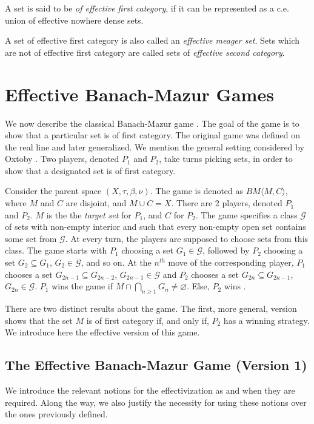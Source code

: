 \documentclass[a4paper,UKenglish,autoref,thm-restate,numberwithinsect]{lipics-v2021}
\begin{document}
\begin{definition}
	A set is said to be \emph{of effective first category}, if it can be represented as a c.e. union of effective nowhere dense sets. 
\end{definition}

A set of effective first category is also called an \textit{effective meager set}. Sets which are not of effective first category are called sets of \textit{effective second category}. 



\section{Effective Banach-Mazur Games}\label{sec:effbmgame}
We now describe the classical Banach-Mazur game \cite{Oxtoby1957}. The goal of the game is to show that a particular set is of first category. The original game was defined on the real line and later generalized. We mention the general setting considered by Oxtoby \cite{Oxtoby1957}. Two players, denoted $P_1$ and $P_2$, take turns picking sets, in order to show that a designated set is of first category. 

Consider the parent space $(X,\tau,\beta,\nu)$. The game is denoted as $BM \langle M,C \rangle$, where $M$ and $C$ are disjoint, and $M\cup C=X$. There are 2 players, denoted $P_1$ and $P_2$. $M$ is the the \textit{target set} for $P_1$, and $C$ for $P_2$. The game specifies a class $\mathcal{G}$ of sets with non-empty interior and such that every non-empty open set contains some set from $\mathcal{G}$. At every turn, the players are supposed to choose sets from this class. The game starts with $P_1$ choosing a set $G_1\in\mathcal{G}$, followed by $P_2$ choosing a set $G_2\subseteq G_1$, $G_2\in\mathcal{G}$, and so on. At the $n^{th}$ move of the corresponding player, $P_1$ chooses a set $G_{2n-1}\subseteq G_{2n-2}$, $G_{2n-1}\in\mathcal{G}$ and $P_2$ chooses a set $G_{2n}\subseteq G_{2n-1}$, $G_{2n}\in\mathcal{G}$. $P_1$ wins the game if $M\cap\bigcap_{n\geq1}G_n\ne\varnothing$. Else, $P_2$ wins \cite{Oxtoby1957}. 

There are two distinct results about the game. The first, more general, version shows that the set $M$ is of first category if, and only if, $P_2$ has a winning strategy. We introduce here the effective version of this game.

\subsection{The Effective Banach-Mazur Game (Version 1)}
We introduce the relevant notions for the effectivization as and when they are required. Along the way, we also justify the necessity for using these notions over the ones previously defined. 
\end{document}

